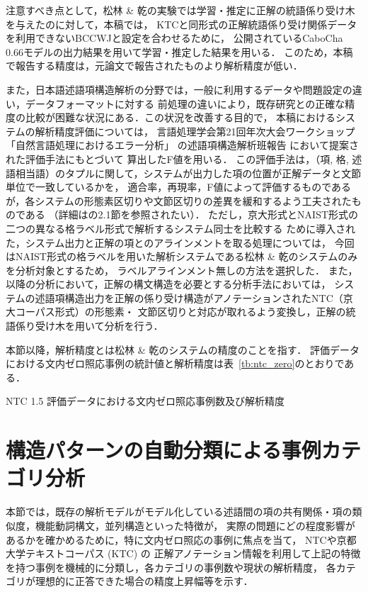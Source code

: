 \documentclass[japanese]{jnlp_1.4}
\begin{document}
注意すべき点として，松林 \& 乾の実験では学習・推定に正解の統語係り受け木を与えたのに対して，本稿では，
KTCと同形式の正解統語係り受け関係データを利用できないBCCWJと設定を合わせるために，
公開されているCaboCha 0.66モデルの出力結果を用いて学習・推定した結果を用いる．
このため，本稿で報告する精度は，元論文で報告されたものより解析精度が低い．

また，日本語述語項構造解析の分野では，一般に利用するデータや問題設定の違い，データフォーマットに対する
前処理の違いにより，既存研究との正確な精度の比較が困難な状況にある．この状況を改善する目的で，
本稿におけるシステムの解析精度評価については，
言語処理学会第21回年次大会ワークショップ「自然言語処理におけるエラー分析」\cite{eaws-2015}
の述語項構造解析班報告\cite{eaws-pas-2015}
において提案された評価手法にもとづいて
算出したF値を用いる．
この評価手法は，（項, 格, 述語相当語）のタプルに関して，システムが出力した項の位置が正解データと文節単位で一致しているかを，
適合率，再現率，F値によって評価するものであるが，各システムの形態素区切りや文節区切りの差異を緩和するよう工夫されたものである
（詳細は\cite{eaws-pas-2015}の2.1節を参照されたい）．
ただし，京大形式とNAIST形式の二つの異なる格ラベル形式で解析するシステム同士を比較する
ために導入された，システム出力と正解の項とのアラインメントを取る処理については，
今回はNAIST形式の格ラベルを用いた解析システムである松林 \& 乾のシステムのみを分析対象とするため，
ラベルアラインメント無しの方法を選択した．
また，以降の分析において，正解の構文構造を必要とする分析手法においては，
システムの述語項構造出力を正解の係り受け構造がアノテーションされたNTC（京大コーパス形式）の形態素・
文節区切りと対応が取れるよう変換し，正解の統語係り受け木を用いて分析を行う．

本節以降，解析精度とは松林 \& 乾のシステムの精度のことを指す．                            
評価データにおける文内ゼロ照応事例の統計値と解析精度は表~\ref{tb:ntc_zero}のとおりである．

\begin{table}[t]
\caption{NTC 1.5 評価データにおける文内ゼロ照応事例数及び解析精度}
\label{tb:ntc_zero}

\end{table}


\section{構造パターンの自動分類による事例カテゴリ分析}
\label{sec:pattern-analysis}

本節では，既存の解析モデルがモデル化している述語間の項の共有関係・項の類似度，機能動詞構文，並列構造といった特徴が，
実際の問題にどの程度影響があるかを確かめるために，特に文内ゼロ照応の事例に焦点を当て，
NTCや京都大学テキストコーパス (KTC) の
正解アノテーション情報を利用して上記の特徴を持つ事例を機械的に分類し，各カテゴリの事例数や現状の解析精度，
各カテゴリが理想的に正答できた場合の精度上昇幅等を示す．
\end{document}
